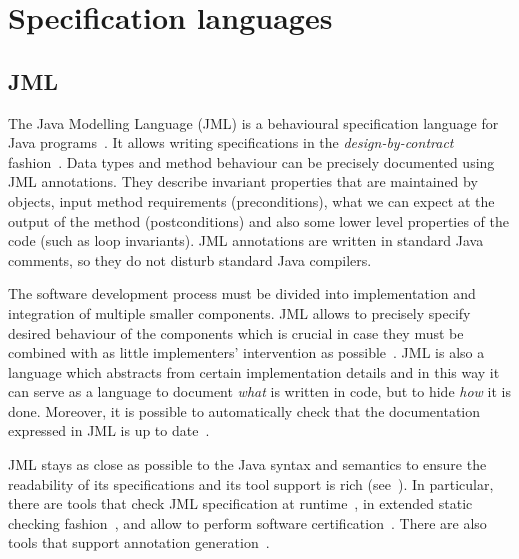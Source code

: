 \documentclass{llncs}
\begin{document}
\vspace*{-0.5\baselineskip}

\section{Specification languages}
\label{sec:specification}

\vspace*{-0.5\baselineskip}

\subsection{JML}
The Java Modelling Language (JML) is a behavioural specification
language for Java programs~\cite{JML}. It allows writing
specifications in the \textit{design-by-contract}
fashion~\cite{DesignByContract}. Data types and method behaviour can
be precisely documented using JML annotations. They describe
invariant properties that are maintained by objects, input method
requirements (preconditions), what we can expect at the output of
the method (postconditions) and also some lower level properties of the
code (such as loop invariants). JML annotations are written in
standard Java comments, so they do not disturb standard Java
compilers.

The software development process must be divided into implementation
and integration of multiple smaller components.  JML allows to
precisely specify desired behaviour of the components which is
crucial in case they must be combined with as little implementers'
intervention as possible~\cite{SoftwareReuse}. JML is also a language
which abstracts from certain implementation details and in this way it
can serve as a language to document \emph{what} is written in code,
but to hide \emph{how} it is done. Moreover, it is possible to
automatically check that the documentation expressed in JML is up to
date~\cite{formalDocumentation}.

JML stays as close as possible to the Java syntax and semantics to 
ensure the readability of its specifications and its tool support
is rich (see~\cite{overviewOfJML}). In
particular, there are tools that check JML specification at
runtime~\cite{runtime}, in extended static checking
fashion~\cite{escJava}, and allow to perform software
certification~\cite{krakatoa}. There are also tools that support
annotation generation~\cite{canapa,daikon}.

\vspace*{-0.5\baselineskip}
\end{document}
